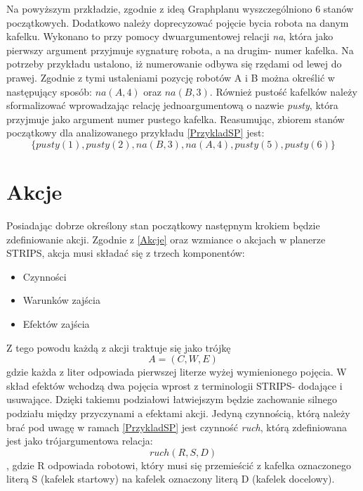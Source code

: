     Na powyższym przkładzie, zgodnie z ideą Graphplanu wyszczególniono 6 stanów początkowych. Dodatkowo należy doprecyzować pojęcie bycia robota na danym kafelku. Wykonano to 
    przy pomocy dwuargumentowej relacji \textit{na}, która jako pierwszy argument przyjmuje sygnaturę robota, a na drugim- numer kafelka. Na potrzeby przykładu ustalono, iż 
    numerowanie odbywa się rzędami od lewej do prawej. Zgodnie z tymi ustaleniami pozycję robotów A i B można określić w następujący sposób: \textit{$na(A,4)$} oraz 
    \textit{$na(B,3)$}. Również pustość kafelków należy sformalizować wprowadzając relację jednoargumentową o nazwie \textit{pusty}, która przyjmuje jako argument numer
    pustego kafelka. Reasumując, zbiorem stanów początkowy dla analizowanego przykładu \ref{PrzykladSP} jest: 
    \begin{equation}
        \{pusty(1),pusty(2),na(B,3),na(A,4),pusty(5),pusty(6)\}
        \label{ZbiorPoczatkowy}
    \end{equation}
\section{Akcje}
    \label{RozdzialAkcje}
    Posiadając dobrze określony stan początkowy następnym krokiem będzie zdefiniowanie akcji. Zgodnie z \ref{Akcje} oraz wzmiance o akcjach w planerze STRIPS,
    akcja musi składać się z trzech komponentów:
    \begin{itemize}
        \item Czynności
        \item Warunków zajścia
        \item Efektów zajścia
    \end{itemize}
    Z tego powodu każdą z akcji traktuje się jako trójkę 
    \begin{equation}
        A=(C,W,E)
    \end{equation}
    gdzie każda z liter odpowiada pierwszej literze wyżej wymienionego pojęcia. 
    W skład efektów wchodzą dwa pojęcia wprost z terminologii STRIPS- dodające i usuwające. Dzięki takiemu podziałowi łatwiejszym będzie 
    zachowanie silnego podziału między przyczynami a efektami akcji. 
    Jedyną czynnością, którą należy brać pod uwagę w ramach \ref{PrzykladSP} jest czynność \textit{ruch}, którą zdefiniowana jest jako trójargumentowa relacja:
    \begin{equation}
        ruch(R,S,D)
    \end{equation}
    , gdzie R odpowiada robotowi, który musi się przemieścić z kafelka oznaczonego literą S (kafelek startowy) na kafelek oznaczony
    literą D (kafelek docelowy).
    
